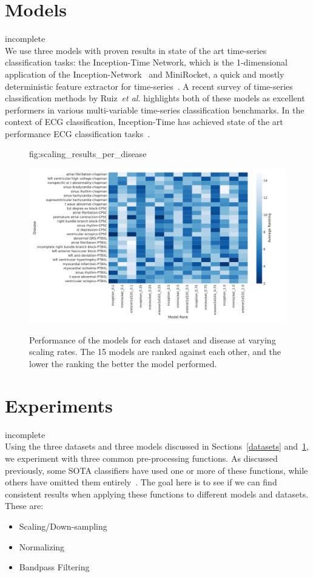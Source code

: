 \documentclass[pmlr,twocolumn]{jmlr}%
\begin{document}
\section{Models}
\label{sec:models}
{\color{red} incomplete}\\
We use three models with proven results in state of the art time-series classification tasks: the Inception-Time Network, which is the 1-dimensional application of the Inception-Network~\cite{szegedy2017inception,ismail2020inceptiontime} and MiniRocket, a quick and mostly deterministic feature extractor for time-series~\cite{dempster2021minirocket}. A recent survey of time-series classification methods by Ruiz~\textit{et al.} highlights both of these models as excellent performers in various multi-variable time-series classification benchmarks. In the context of ECG classification, Inception-Time has achieved state of the art performance ECG classification tasks~\cite{Strodthoff2021}.
\begin{figure}[tbp]
\floatconts
  {fig:scaling_results_per_disease}
  {\caption{Performance of the models for each dataset and disease at varying scaling rates. The 15 models are ranked against each other, and the lower the ranking the better the model performed. }}
  {\includegraphics[width=1\linewidth]{images/Per-Disease_Model_Performance_all.pdf}}
\end{figure}
\section{Experiments}
\label{sec:experiment}
{\color{red} incomplete}\\
Using the three datasets and three models discussed in Sections~\ref{datasets} and~\ref{sec:models}, we experiment with three common pre-processing functions. As discussed previously, some SOTA classifiers have used one or more of these functions, while others have omitted them entirely~\cite{ribeiro2020automatic}. The goal here is to see if we can find consistent results when applying these functions to different models and datasets. These are:
\begin{itemize}
    \item Scaling/Down-sampling
    \item Normalizing
    \item Bandpass Filtering
\end{itemize}
\end{document}
